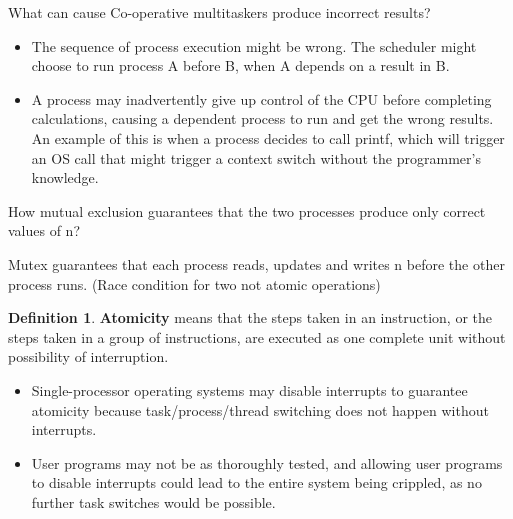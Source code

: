 \documentclass[11pt,a4paper]{article}
\theoremstyle{definition}
\newtheorem{definition}{Definition}[section]
\newenvironment{myitemize}
{ \begin{itemize}
    \setlength{\itemsep}{5pt}
    \setlength{\parskip}{0pt}
    \setlength{\parsep}{0pt}     }
{ \end{itemize}                  }
\begin{document}
\begin{tcolorbox}
	\textsf{What can cause Co-operative multitaskers produce incorrect results?}
	
	\begin{myitemize}
		\item The sequence of process execution might be wrong. The scheduler might choose to run process A before B, when A depends on a result in B.
		\item A process may inadvertently give up control of the CPU before completing calculations, causing a dependent process to run and get the wrong results. An example of this is when a process decides to call \textsf{printf}, which will trigger an OS call that might trigger a context switch without the programmer’s knowledge.
	\end{myitemize}

\end{tcolorbox}

\begin{tcolorbox}
	\textsf{How mutual exclusion guarantees that the two processes produce only correct values of n?}
	
	Mutex guarantees that each process reads, updates and writes n before the other process runs. (Race condition for two not atomic operations)
\end{tcolorbox}

\begin{definition}{\textbf{Atomicity}}
	means that the steps taken in an instruction, or the steps taken in a group of instructions, are executed as one complete unit without possibility of interruption.
	\begin{myitemize}
		\item Single-processor operating systems may disable interrupts to guarantee atomicity because task/process/thread switching does not happen without interrupts.
		\item User programs may not be as thoroughly tested, and allowing user programs to disable interrupts could lead to the entire system being crippled, as no further task switches would be possible.
	\end{myitemize}
\end{definition}
\end{document}
